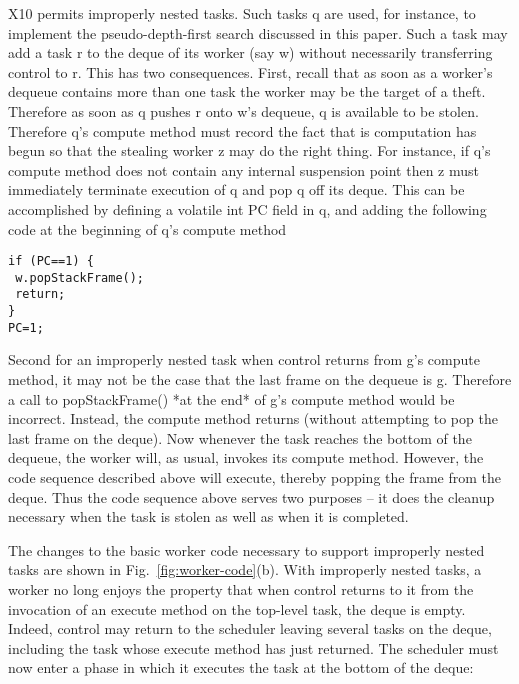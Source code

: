 X10 permits improperly nested tasks. Such tasks q are used, for
instance, to implement the pseudo-depth-first search discussed in this
paper. Such a task may add a task r to the deque of its worker (say w)
without necessarily transferring control to r. This has two
consequences. First, recall that as soon as a worker's dequeue
contains more than one task the worker may be the target of a
theft. Therefore as soon as q pushes r onto w's dequeue, q is
available to be stolen.  Therefore q's compute method must record the
fact that is computation has begun so that the stealing worker z may
do the right thing. For instance, if q's compute method does not
contain any internal suspension point then z must immediately
terminate execution of q and pop q off its deque. This can be
accomplished by defining a volatile int PC field in q, and adding the
following code at the beginning of q's compute method

\begin{verbatim}
if (PC==1) {
 w.popStackFrame();
 return;
}
PC=1;
\end{verbatim}

Second for an improperly nested task when control returns from g's
compute method, it may not be the case that the last frame on the
dequeue is g. Therefore a call to popStackFrame() *at the end* of g's
compute method would be incorrect. Instead, the compute method returns
(without attempting to pop the last frame on the deque). Now whenever
the task reaches the bottom of the dequeue, the worker will, as usual,
invokes its compute method. However, the code sequence described above
will execute, thereby popping the frame from the deque. Thus the code
sequence above serves two purposes -- it does the cleanup necessary
when the task is stolen as well as when it is completed.

The changes to the basic worker code necessary to support improperly
nested tasks are shown in Fig.~\ref{fig:worker-code}(b). With
improperly nested tasks, a worker no long enjoys the property that
when control returns to it from the invocation of an execute method on
the top-level task, the deque is empty. Indeed, control may return to
the scheduler leaving several tasks on the deque, including the task
whose execute method has just returned. The scheduler must now enter a
phase in which it executes the task at the bottom of the deque:

